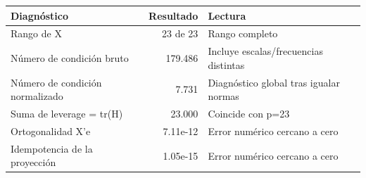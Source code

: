 \begin{tabular}{lrl}
\toprule
Diagnóstico & Resultado & Lectura \\
\midrule
Rango de X & 23 de 23 & Rango completo \\
Número de condición bruto & 179.486 & Incluye escalas/frecuencias distintas \\
Número de condición normalizado & 7.731 & Diagnóstico global tras igualar normas \\
Suma de leverage = tr(H) & 23.000 & Coincide con p=23 \\
Ortogonalidad X'e & 7.11e-12 & Error numérico cercano a cero \\
Idempotencia de la proyección & 1.05e-15 & Error numérico cercano a cero \\
\bottomrule
\end{tabular}
